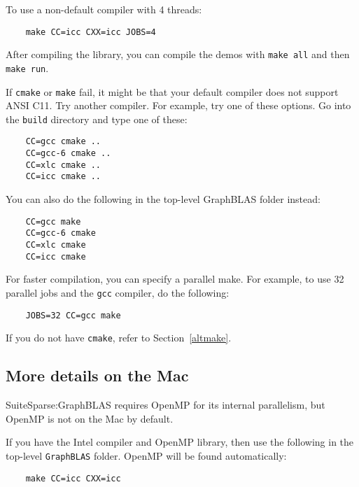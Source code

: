 \documentclass[12pt]{article}
\begin{document}
To use a non-default compiler with 4 threads:

    {\small
    \begin{verbatim}
    make CC=icc CXX=icc JOBS=4 \end{verbatim} }

After compiling the library, you can compile the demos with
\verb'make all' and then \verb'make run'.

If \verb'cmake' or \verb'make' fail, it might be that your default compiler
does not support ANSI C11.  Try another compiler.  For example, try one of
these options.  Go into the \verb'build' directory and type one of these:

    {\small
    \begin{verbatim}
    CC=gcc cmake ..
    CC=gcc-6 cmake ..
    CC=xlc cmake ..
    CC=icc cmake ..  \end{verbatim} }

You can also do the following in the top-level GraphBLAS folder instead:

    {\small
    \begin{verbatim}
    CC=gcc make
    CC=gcc-6 cmake
    CC=xlc cmake
    CC=icc cmake \end{verbatim} }

For faster compilation, you can specify a parallel make.  For example,
to use 32 parallel jobs and the \verb'gcc' compiler, do the following:

    {\small
    \begin{verbatim}
    JOBS=32 CC=gcc make \end{verbatim} }

If you do not have \verb'cmake', refer to Section~\ref{altmake}.

\subsection{More details on the Mac}

SuiteSparse:GraphBLAS requires OpenMP for its internal parallelism, but
OpenMP is not on the Mac by default.

If you have the Intel compiler and OpenMP library, then use the following
in the top-level \verb'GraphBLAS' folder.  OpenMP will be found automatically:

    {\small
    \begin{verbatim}
    make CC=icc CXX=icc \end{verbatim} }
\end{document}
